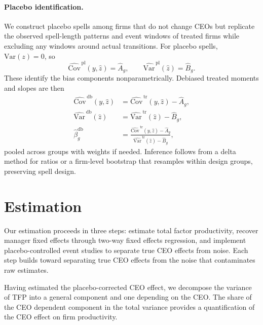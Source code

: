 \documentclass[11pt,a4paper]{article}
\newcommand{\Var}{\text{Var}}
\newcommand{\Cov}{\text{Cov}}
\begin{document}
\paragraph{Placebo identification.} We construct placebo spells among firms that do not change CEOs but replicate the observed spell-length patterns and event windows of treated firms while excluding any windows around actual transitions. For placebo spells, $\Var(z)=0$, so
\begin{equation}
\widehat{\Cov}^{\,\text{pl}}(y,\hat z)=\hat A_g,\qquad \widehat{\Var}^{\,\text{pl}}(\hat z)=\hat B_g.
\end{equation}
These identify the bias components nonparametrically. Debiased treated moments and slopes are then
\begin{align}
\widehat{\Cov}^{\,\text{db}}(y,\hat z) &= \widehat{\Cov}^{\,\text{tr}}(y,\hat z) - \hat A_g,\\
\widehat{\Var}^{\,\text{db}}(\hat z) &= \widehat{\Var}^{\,\text{tr}}(\hat z) - \hat B_g,\\
\hat\beta^{\text{db}}_g &= \frac{\widehat{\Cov}^{\,\text{tr}}(y,\hat z)-\hat A_g}{\widehat{\Var}^{\,\text{tr}}(\hat z)-\hat B_g},
\end{align}
pooled across groups with weights if needed. Inference follows from a delta method for ratios or a firm-level bootstrap that resamples within design groups, preserving spell design.

\section{Estimation}\label{sec:est}

Our estimation proceeds in three steps: estimate total factor productivity, recover manager fixed effects through two-way fixed effects regression, and implement placebo-controlled event studies to separate true CEO effects from noise. Each step builds toward separating true CEO effects from the noise that contaminates raw estimates.

Having estimated the placebo-corrected CEO effect, we decompose the variance of TFP into a general component and one depending on the CEO. The share of the CEO dependent component in the total variance provides a quantification of the CEO effect on firm productivity.
\end{document}
